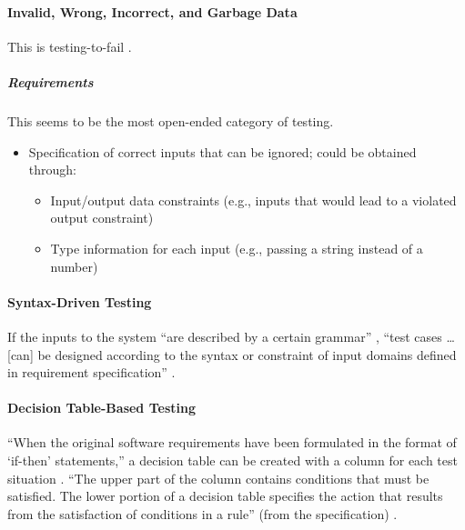 \paragraph{Invalid, Wrong, Incorrect, and Garbage Data
      \cite[pp.~78-79]{patton_software_2006}}

This is testing-to-fail \cite[p.~77]{patton_software_2006}.

\subparagraph{Requirements}
This seems to be the most open-ended category of testing.
\begin{itemize}
      \item Specification of correct inputs that can be ignored;
            could be obtained through:
            \begin{itemize}
                  \item Input/output data constraints (e.g., inputs that would
                        lead to a violated output constraint)
                  \item Type information for each input (e.g., passing a string
                        instead of a number)
            \end{itemize}
\end{itemize}

\paragraph{Syntax-Driven Testing \cite[pp.~448-449]{peters_software_2000}}

If the inputs to the system ``are described by a certain grammar''
\cite[p.~448]{peters_software_2000}, ``test cases \dots [can] be designed
according to the syntax or constraint of input domains defined in requirement
specification'' \cite[p.~260]{intana_syntest_2020} 
.

\paragraph{Decision Table-Based Testing \cite[pp.~448,450-453]{peters_software_2000}}

``When the original software requirements have been formulated in the format of
`if-then' statements,'' a decision table can be created with a column for each
test situation \cite[p.~448]{peters_software_2000}. ``The upper part of the
column contains conditions that must be satisfied. The lower portion of a
decision table specifies the action that results from the satisfaction of
conditions in a rule'' (from the specification) \cite[p.~450]{peters_software_2000}.

